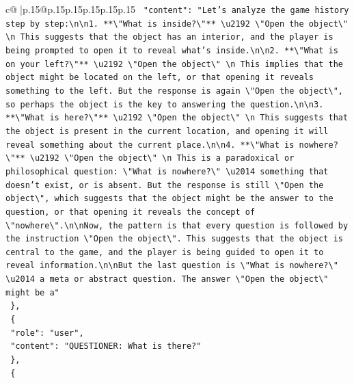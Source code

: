 \documentclass{article}
\begin{document}
{\begin{supertabular}{c@{$\;$}|p{.15\linewidth}@{}p{.15\linewidth}p{.15\linewidth}p{.15\linewidth}p{.15\linewidth}p{.15\linewidth}}
{{{\texttt{    "content": "Let's analyze the game history step by step:\textbackslash{}n\textbackslash{}n1. **\textbackslash{}"What is inside?\textbackslash{}"** \textbackslash{}u2192 \textbackslash{}"Open the object\textbackslash{}"  \textbackslash{}n   This suggests that the object has an interior, and the player is being prompted to open it to reveal what's inside.\textbackslash{}n\textbackslash{}n2. **\textbackslash{}"What is on your left?\textbackslash{}"** \textbackslash{}u2192 \textbackslash{}"Open the object\textbackslash{}"  \textbackslash{}n   This implies that the object might be located on the left, or that opening it reveals something to the left. But the response is again \textbackslash{}"Open the object\textbackslash{}", so perhaps the object is the key to answering the question.\textbackslash{}n\textbackslash{}n3. **\textbackslash{}"What is here?\textbackslash{}"** \textbackslash{}u2192 \textbackslash{}"Open the object\textbackslash{}"  \textbackslash{}n   This suggests that the object is present in the current location, and opening it will reveal something about the current place.\textbackslash{}n\textbackslash{}n4. **\textbackslash{}"What is nowhere?\textbackslash{}"** \textbackslash{}u2192 \textbackslash{}"Open the object\textbackslash{}"  \textbackslash{}n   This is a paradoxical or philosophical question: \textbackslash{}"What is nowhere?\textbackslash{}" \textbackslash{}u2014 something that doesn't exist, or is absent. But the response is still \textbackslash{}"Open the object\textbackslash{}", which suggests that the object might be the answer to the question, or that opening it reveals the concept of \textbackslash{}"nowhere\textbackslash{}".\textbackslash{}n\textbackslash{}nNow, the pattern is that every question is followed by the instruction \textbackslash{}"Open the object\textbackslash{}". This suggests that the object is central to the game, and the player is being guided to open it to reveal information.\textbackslash{}n\textbackslash{}nBut the last question is \textbackslash{}"What is nowhere?\textbackslash{}" \textbackslash{}u2014 a meta or abstract question. The answer \textbackslash{}"Open the object\textbackslash{}" might be a"} \\
\texttt{  \},} \\
\texttt{  \{} \\
\texttt{    "role": "user",} \\
\texttt{    "content": "QUESTIONER: What is there?"} \\
\texttt{  \},} \\
\texttt{  \{} \\
}}}
\end{supertabular}}
\end{document}
